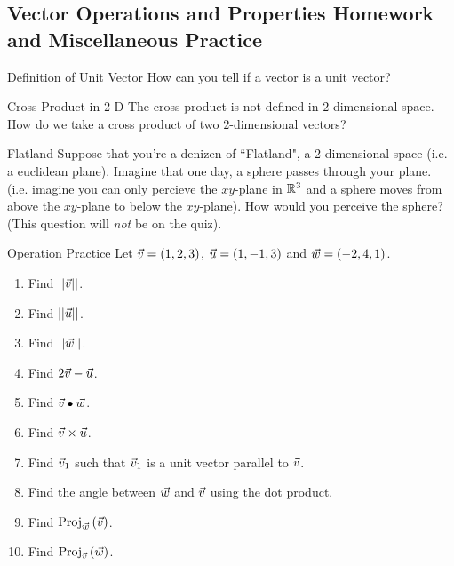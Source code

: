 \renewcommand\thesubsection{\thesection.\Alph{subsection}}
\setcounter{subsection}{17}
\subsection{Vector Operations and Properties Homework and Miscellaneous Practice}
\begin{exercise}{Definition of Unit Vector}
How can you tell if a vector is a unit vector? 
\end{exercise}

\begin{exercise}{Cross Product in 2-D}
The cross product is not defined in $2$-dimensional space. How do we take a cross product of two $2$-dimensional vectors?
\end{exercise}

\begin{exercise}{Flatland}
Suppose that you're a denizen of ``Flatland", a 2-dimensional space (i.e. a euclidean plane). Imagine that one day, a sphere passes through your plane. (i.e. imagine you can only percieve the $xy$-plane in $\mathbb{R}^3$ and a sphere moves from above the $xy$-plane to below the $xy$-plane). How would you perceive the sphere? (This question will \textit{not} be on the quiz).
\end{exercise}

\begin{exercise}{Operation Practice}
Let $\vec{v}=(1,2,3)$, $\vec{u}=(1,-1,3)$ and $\vec{w}=(-2,4,1)$.
\vspace{1em}
\begin{enumerate}
\item Find $||\vec{v}||$.
\vspace{1em}
\item Find $||\vec{u}||$.
\vspace{1em}
\item Find $||\vec{w}||$.
\vspace{1em}
\item Find $2\vec{v}-\vec{u}$.
\vspace{1em}
\item Find $\vec{v}\bullet\vec{w}$.
\vspace{1em}
\item Find $\vec{v}\times\vec{u}$.
\vspace{1em}
\item Find $\vec{v}_1$ such that $\vec{v}_1$ is a unit vector parallel to $\vec{v}$.
\vspace{1em}
\item Find the angle between $\vec{w}$ and $\vec{v}$ using the dot product.
\vspace{1em}
\item Find $\mathrm{Proj}_{\vec{w}}\left({\vec{v}}\right)$.
\vspace{1em}
\item Find $\mathrm{Proj}_{\vec{v}}\left({\vec{w}}\right)$.
\end{enumerate}
\end{exercise}

